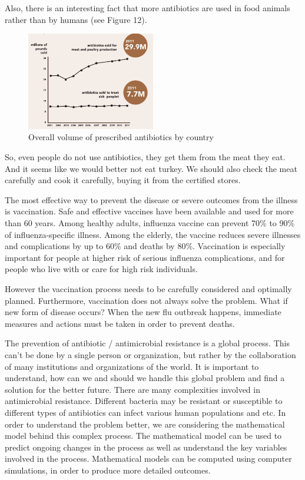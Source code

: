 Also, there is an interesting fact that more antibiotics are used in food animals rather than by humans (see Figure 12).

\begin{figure}[H]
  \centering
  \includegraphics[width=0.5\textwidth]{img/Fig12}
  \caption{Overall volume of prescribed antibiotics by country}
  \label{fig12}
\end{figure}

So, even people do not use antibiotics, they get them from the meat they eat. And it seems like we would better not eat turkey. We should also check the meat carefully and cook it carefully, buying it from the certified stores.

The most effective way to prevent the disease or severe outcomes from the illness is vaccination. Safe and effective vaccines have been available and used for more than 60 years. Among healthy adults, influenza vaccine can prevent 70\% to 90\% of influenza-specific illness. Among the elderly, the vaccine reduces severe illnesses and complications by up to 60\% and deaths by 80\%. Vaccination is especially important for people at higher risk of serious influenza complications, and for people who live with or care for high risk individuals.

However the vaccination process needs to be carefully considered and optimally planned. Furthermore, vaccination does not always solve the problem. What if new form of disease occurs? When the new flu outbreak happens, immediate measures and actions must be taken in order to prevent deaths.

The prevention of antibiotic / antimicrobial resistance is a global process. This can’t be done by a single person or organization, but rather by the collaboration of many institutions and organizations of the world. It is important to understand, how can we and should we handle this global problem and find a solution for the better future. There are many complexities involved in antimicrobial resistance. Different bacteria may be resistant or susceptible to different types of antibiotics can infect various human populations and etc. In order to understand the problem better, we are considering the mathematical model behind this complex process. The mathematical model can be used to predict ongoing changes in the process as well as understand the key variables involved in the process. Mathematical models can be computed using computer simulations, in order to produce more detailed outcomes.


